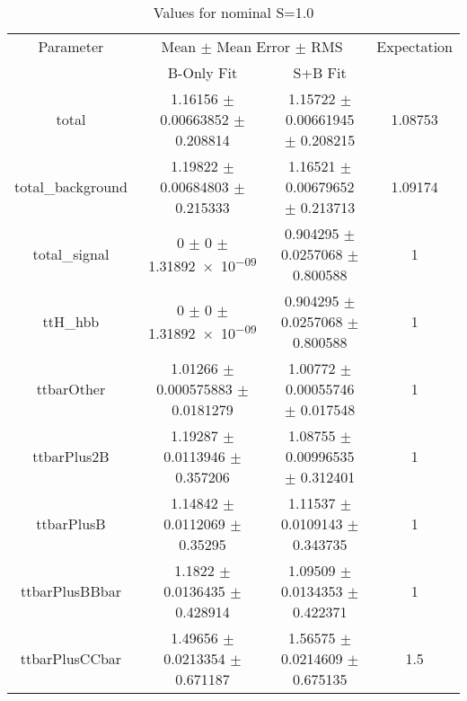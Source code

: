 \begin{table}
\centering
\caption{Values for nominal S=1.0}
\begin{tabular}{cccc}
\toprule
Parameter & \multicolumn{2}{c}{Mean $\pm$ Mean Error $\pm$ RMS} & Expectation\\
 & B-Only Fit & S+B Fit & \\
\midrule
total & \num{1.16156} $\pm$ \num{0.00663852} $\pm$ \num{0.208814} & \num{1.15722} $\pm$ \num{0.00661945} $\pm$ \num{0.208215} & \num{1.08753}\\
total\_background & \num{1.19822} $\pm$ \num{0.00684803} $\pm$ \num{0.215333} & \num{1.16521} $\pm$ \num{0.00679652} $\pm$ \num{0.213713} & \num{1.09174}\\
total\_signal & \num{0} $\pm$ \num{0} $\pm$ \num{1.31892e-09} & \num{0.904295} $\pm$ \num{0.0257068} $\pm$ \num{0.800588} & \num{1}\\
ttH\_hbb & \num{0} $\pm$ \num{0} $\pm$ \num{1.31892e-09} & \num{0.904295} $\pm$ \num{0.0257068} $\pm$ \num{0.800588} & \num{1}\\
ttbarOther & \num{1.01266} $\pm$ \num{0.000575883} $\pm$ \num{0.0181279} & \num{1.00772} $\pm$ \num{0.00055746} $\pm$ \num{0.017548} & \num{1}\\
ttbarPlus2B & \num{1.19287} $\pm$ \num{0.0113946} $\pm$ \num{0.357206} & \num{1.08755} $\pm$ \num{0.00996535} $\pm$ \num{0.312401} & \num{1}\\
ttbarPlusB & \num{1.14842} $\pm$ \num{0.0112069} $\pm$ \num{0.35295} & \num{1.11537} $\pm$ \num{0.0109143} $\pm$ \num{0.343735} & \num{1}\\
ttbarPlusBBbar & \num{1.1822} $\pm$ \num{0.0136435} $\pm$ \num{0.428914} & \num{1.09509} $\pm$ \num{0.0134353} $\pm$ \num{0.422371} & \num{1}\\
ttbarPlusCCbar & \num{1.49656} $\pm$ \num{0.0213354} $\pm$ \num{0.671187} & \num{1.56575} $\pm$ \num{0.0214609} $\pm$ \num{0.675135} & \num{1.5}\\
\bottomrule
\end{tabular}
\end{table}